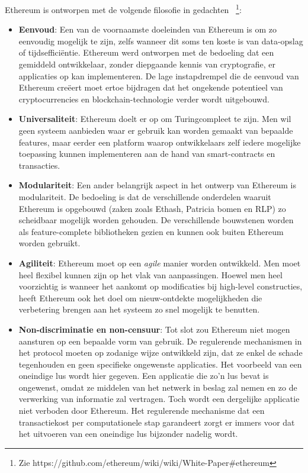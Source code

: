 			Ethereum is ontworpen met de volgende filosofie in gedachten ~\autocite{Buterin2014}\footnote{Zie https://github.com/ethereum/wiki/wiki/White-Paper\#ethereum}:
			\begin{itemize}
				\setlength\itemsep{1em}
				\item \textbf{Eenvoud}: 
				Een van de voornaamste doeleinden van Ethereum is om zo eenvoudig mogelijk te zijn, zelfs wanneer dit soms ten koste is van data-opslag of tijdsefficiëntie. Ethereum werd ontworpen met de bedoeling dat een gemiddeld ontwikkelaar, zonder diepgaande kennis van cryptografie, er applicaties op kan implementeren. De lage instapdrempel die de eenvoud van Ethereum creëert moet ertoe bijdragen dat het ongekende potentieel van cryptocurrencies en blockchain-technologie verder wordt uitgebouwd.
				\item \textbf{Universaliteit}: Ethereum doelt er op om Turingcompleet te zijn. Men wil  geen systeem aanbieden waar er gebruik kan worden gemaakt van bepaalde features, maar eerder een platform waarop ontwikkelaars zelf iedere mogelijke toepassing kunnen implementeren aan de hand van smart-contracts en transacties.
				\item \textbf{Modulariteit}: 
				Een ander belangrijk aspect in het ontwerp van Ethereum is modulariteit. De bedoeling is dat de verschillende onderdelen waaruit Ethereum is opgebouwd (zaken zoals Ethash, Patricia bomen en RLP) zo scheidbaar mogelijk worden gehouden. De verschillende bouwstenen worden als feature-complete bibliotheken gezien en kunnen ook buiten Ethereum worden gebruikt.
				\item \textbf{Agiliteit}: 
				Ethereum moet op een \textit{agile} manier worden ontwikkeld. Men moet heel flexibel kunnen zijn op het vlak van aanpassingen. Hoewel men heel voorzichtig is wanneer het aankomt op modificaties bij high-level constructies, heeft Ethereum ook het doel om nieuw-ontdekte mogelijkheden die verbetering brengen aan het systeem zo snel mogelijk te benutten.
				\item \textbf{Non-discriminatie en non-censuur}: 
				Tot slot zou Ethereum niet mogen aansturen op een bepaalde vorm van gebruik. De regulerende mechanismen in het protocol moeten op zodanige wijze ontwikkeld zijn, dat ze enkel de schade tegenhouden en geen specifieke ongewenste applicaties. Het voorbeeld van een oneindige lus wordt hier gegeven. Een applicatie die zo'n lus bevat is ongewenst, omdat ze middelen van het netwerk in beslag zal nemen en zo de verwerking van informatie zal vertragen. Toch wordt een dergelijke applicatie niet verboden door Ethereum. Het regulerende mechanisme dat een transactiekost per computationele stap garandeert zorgt er immers voor dat  het uitvoeren van een oneindige lus bijzonder nadelig wordt.
			\end{itemize}
